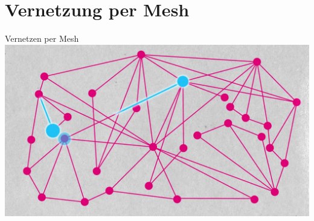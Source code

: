 \documentclass{beamer}
\begin{document}
	\section{Vernetzung per Mesh}
	\begin{frame}{Vernetzen per Mesh}
		\includegraphics[width=\textwidth]{media/mesh2.png}
	\end{frame}


\end{document}
